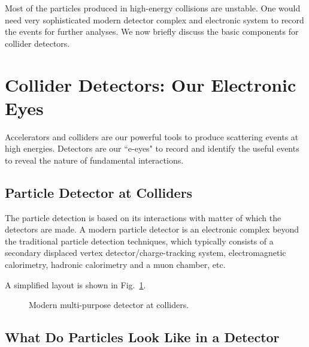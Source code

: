 \documentclass[12pt,prd,aps,floats,preprintnumbers,preprint,superscriptaddress,floatfix,nofootinbib]{revtex4}
\begin{document}
Most of the particles produced in high-energy collisions are unstable.
One would need very sophisticated modern detector complex and
electronic system to record the events for further analyses. 
We now briefly discuss the basic components for collider detectors.

\section{Collider Detectors:  Our Electronic Eyes}
\label{detector}

Accelerators and colliders are our powerful tools to produce 
scattering events at high energies. Detectors are our  ``e-eyes"
to record and identify the useful events to reveal the nature of 
fundamental interactions.

\subsection{Particle Detector at Colliders}
The particle detection is based on its interactions with matter of which
the detectors are made. 
A modern particle detector is an electronic complex beyond the traditional
particle detection techniques,  which typically consists of a 
secondary displaced vertex detector/charge-tracking system, 
electromagnetic calorimetry, hadronic calorimetry and a muon chamber, etc. 

A simplified layout is shown in Fig.~\ref{fig:detect}.

\begin{center}
\begin{figure}[tb]
\caption{Modern multi-purpose detector at colliders.
\label{fig:detect}}
\end{figure}
\end{center}

\subsection{What Do Particles Look Like in a Detector}
\end{document}
